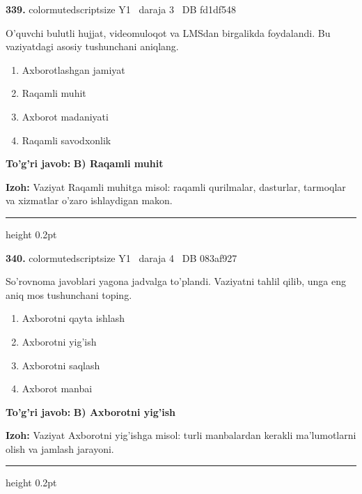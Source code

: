 \documentclass[10pt,a4paper,oneside]{article}
\begin{document}
\noindent\textbf{\color{ink}339.}  {color{muted}scriptsize Y1 \textbullet\ daraja 3 \textbullet\ DB fd1df548}
\par
O'quvchi bulutli hujjat, videomuloqot va LMSdan birgalikda foydalandi. Bu vaziyatdagi asosiy tushunchani aniqlang.
\begin{enumerate}[label=\Alph*),leftmargin=9mm]
\item Axborotlashgan jamiyat
\item Raqamli muhit
\item Axborot madaniyati
\item Raqamli savodxonlik
\end{enumerate}
\begin{tcolorbox}[enhanced,breakable,colback=teal!4,colframe=teal!50!black,boxrule=0.5pt,arc=1.1mm,left=3mm,right=3mm,top=1.7mm,bottom=1.7mm,before skip=2mm,after skip=2mm]
\textbf{\color{teal}To'g'ri javob:} \textbf{B) Raqamli muhit}
\par\smallskip
\textbf{Izoh:} Vaziyat Raqamli muhitga misol: raqamli qurilmalar, dasturlar, tarmoqlar va xizmatlar o'zaro ishlaydigan makon.
\end{tcolorbox}
\vspace{2mm}\hrule height 0.2pt \vspace{3mm}

\noindent\textbf{\color{ink}340.}  {color{muted}scriptsize Y1 \textbullet\ daraja 4 \textbullet\ DB 083af927}
\par
So'rovnoma javoblari yagona jadvalga to'plandi. Vaziyatni tahlil qilib, unga eng aniq mos tushunchani toping.
\begin{enumerate}[label=\Alph*),leftmargin=9mm]
\item Axborotni qayta ishlash
\item Axborotni yig'ish
\item Axborotni saqlash
\item Axborot manbai
\end{enumerate}
\begin{tcolorbox}[enhanced,breakable,colback=teal!4,colframe=teal!50!black,boxrule=0.5pt,arc=1.1mm,left=3mm,right=3mm,top=1.7mm,bottom=1.7mm,before skip=2mm,after skip=2mm]
\textbf{\color{teal}To'g'ri javob:} \textbf{B) Axborotni yig'ish}
\par\smallskip
\textbf{Izoh:} Vaziyat Axborotni yig'ishga misol: turli manbalardan kerakli ma'lumotlarni olish va jamlash jarayoni.
\end{tcolorbox}
\vspace{2mm}\hrule height 0.2pt \vspace{3mm}
\end{document}
